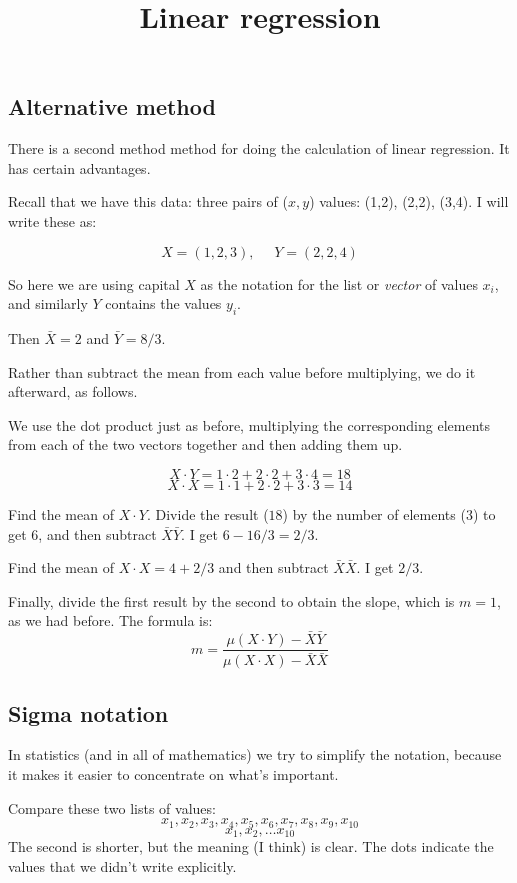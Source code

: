 \documentclass[11pt, oneside]{article}
\title{Linear regression}
\date{}
\begin{document}
\maketitle
\Large

\subsection*{Alternative method}

There is a second method method for doing the calculation of linear regression.  It has certain advantages.  

Recall that we have this data:  three pairs of ($x,y$) values: (1,2), (2,2), (3,4).  I will write these as:

\[ X = (1,2,3), \ \ \ \ \ \ Y = (2,2,4) \]

So here we are using capital $X$ as the notation for the list or \emph{vector} of values $x_i$, and similarly $Y$ contains the values $y_i$.

Then $\bar{X} = 2$ and $\bar{Y} = 8/3$.

Rather than subtract the mean from each value before multiplying, we do it afterward, as follows.

We use the dot product just as before, multiplying the corresponding elements from each of the two vectors together and then adding them up.

\[ X \cdot Y = 1 \cdot 2 + 2 \cdot 2 + 3 \cdot 4 = 18 \]
\[ X \cdot X = 1 \cdot 1 + 2 \cdot 2 + 3 \cdot 3 = 14 \]

Find the mean of $X \cdot Y$.  Divide the result ($18$) by the number of elements ($3$) to get $6$, and then subtract $\bar{X} \bar{Y}$.  I get $6 - 16/3 = 2/3$.

Find the mean of $X \cdot X = 4+2/3$ and then subtract $\bar{X} \bar{X}$.  I get $2/3$.

Finally, divide the first result by the second to obtain the slope, which is $m=1$, as we had before.  The formula is:
\[ m = \frac{ \mu(X \cdot Y) - \bar{X} \bar{Y}}{\mu(X \cdot X) - \bar{X} \bar{X}} \]

\subsection*{Sigma notation}
In statistics (and in all of mathematics) we try to simplify the notation, because it makes it easier to concentrate on what's important.  

Compare these two lists of values:
\[ x_1, x_2, x_3, x_4, x_5, x_6, x_7, x_8, x_9, x_{10} \]
\[ x_1, x_2, \dots x_{10} \]
The second is shorter, but the meaning (I think) is clear.  The dots indicate the values that we didn't write explicitly.
\end{document}
